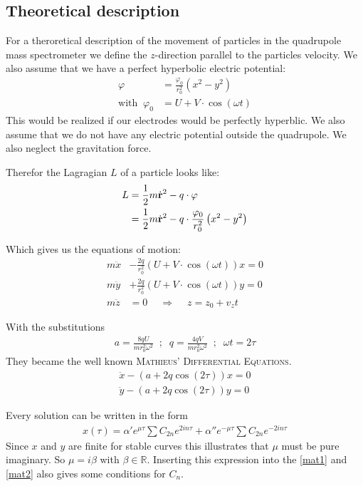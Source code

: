 \documentclass[a4paper, parskip=half]{scrartcl}
\begin{document}
\subsection{Theoretical description}
For a theroretical description of the movement of particles in the quadrupole mass spectrometer we define the $z$-direction parallel to the particles velocity. We also assume that we have a perfect hyperbolic electric potential:
\begin{align}
\varphi &= \frac{\varphi_0}{r_0^2} \left(x^2 - y^2 \right)\\
\text{with}\;\;\varphi_0 &= U + V \cdot \cos\left(\omega t\right)
\end{align} 
This would be realized if our electrodes would be perfectly hyperblic. We also assume that we do not have any electric potential outside the quadrupole. We also neglect the gravitation force.


Therefor the Lagragian $L$ of a particle looks like:
\begin{align}
L &= \frac{1}{2}m\dot{\bf r}^2 - q \cdot \varphi \\
&= \frac{1}{2}m \dot{\bf r}^2 - q \cdot \frac{\varphi_0}{r_0^2}\left(x^2 - y^2 \right)
\end{align}

Which gives us the equations of motion:
\begin{align}
m\ddot{x} &- \frac{2q}{r_0^2} \left( U + V \cdot \cos\left(\omega t\right) \right ) x = 0 \\
m\ddot{y} &+ \frac{2q}{r_0^2} \left( U + V \cdot \cos\left(\omega t\right) \right ) y = 0 \\
m\ddot{z} &= 0 \;\;\,\,\,\, \Rightarrow \;\;\,\,\,\, z = z_0 + v_zt
\end{align}

With the substitutions
\begin{align}
a = \frac{8qU}{mr_0^2\omega^2} \;\; ; \;\; q = \frac{4qV}{mr_0^2\omega^2} \;\; ; \;\; \omega t = 2 \tau
\end{align}
They became the well known \textsc{Mathieus’ Differential Equations}.
\begin{align}
\ddot{x} - \left(a + 2q\cos\left(2\tau\right)\right) x \label{mat1} = 0\\
\ddot{y} - \left(a + 2q\cos\left(2\tau\right)\right) y \label{mat2} = 0
\end{align}

Every solution can be written in the form
\begin{align}
x(\tau) = \alpha'e^{\mu\tau} \sum C_{2n}e^{2in\tau} + \alpha''e^{-\mu\tau} \sum C_{2n}e^{-2in\tau}
\end{align}
Since $x$ and $y$ are finite for stable curves this illustrates that $\mu$ must be pure imaginary. So $\mu = i \beta$ with $\beta \in \mathbb{R}$.
Inserting this expression into the \eqref{mat1} and \eqref{mat2} also gives some conditions for $C_{n}$. 
\end{document}
